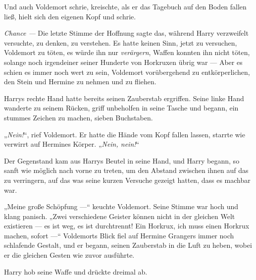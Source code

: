 Und auch Voldemort schrie, kreischte, als er das Tagebuch auf den Boden fallen ließ, hielt sich den eigenen Kopf und schrie.

\emph{Chance —}
%
Die letzte Stimme der Hoffnung sagte das, während Harry verzweifelt versuchte, zu denken, zu verstehen. Es hatte keinen Sinn, jetzt zu versuchen, Voldemort zu töten, es würde ihn nur \emph{verärgern}, Waffen konnten ihn nicht töten, solange noch irgendeiner seiner Hunderte von Horkruxen übrig war —
Aber es schien es immer noch wert zu sein, Voldemort vorübergehend zu entkörperlichen, den Stein und Hermine zu nehmen und zu fliehen.

Harrys rechte Hand hatte bereits seinen Zauberstab ergriffen. Seine linke Hand wanderte zu seinem Rücken, griff unbeholfen in seine Tasche und begann, ein stummes Zeichen zu machen, sieben Buchstaben.

„\emph{Nein!}“, rief Voldemort. Er hatte die Hände vom Kopf fallen lassen, starrte wie verwirrt auf Hermines Körper.
„\emph{Nein, nein!}“

Der Gegenstand kam aus Harrys Beutel in seine Hand, und Harry begann, so sanft wie möglich nach vorne zu treten, um den Abstand zwischen ihnen auf das zu verringern, auf das was seine kurzen Versuche gezeigt hatten, dass es machbar war.

„Meine große Schöpfung —“ keuchte Voldemort. Seine Stimme war hoch und klang panisch.
„Zwei verschiedene Geister können nicht in der gleichen Welt existieren — es ist weg, es ist durchtrennt! Ein Horkrux, ich muss einen Horkrux machen, sofort —“
Voldemorts Blick fiel auf Hermine Grangers immer noch schlafende Gestalt, und er begann, seinen Zauberstab in die Luft zu heben, wobei er die gleichen Gesten wie zuvor ausführte.

Harry hob seine Waffe und drückte dreimal ab.

